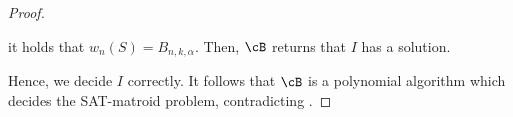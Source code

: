\begin{proof}
\begin{itemize}
		it holds that $w_n(S) = B_{n,k,\alpha}$. Then, $\cB$ returns that $I$ has a solution.  
	\end{itemize}
	Hence, %
	we decide $I$ correctly. %
	It follows that $\cB$ is %
	a polynomial algorithm which decides the SAT-matroid problem, contradicting . 
\end{proof}















